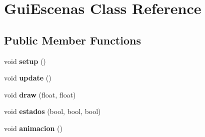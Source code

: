 \hypertarget{class_gui_escenas}{}\section{Gui\+Escenas Class Reference}
\label{class_gui_escenas}
\subsection*{Public Member Functions}
\begin{DoxyCompactItemize}
\item 
\hypertarget{class_gui_escenas_afd7a3d6c2ff49ce9f17e1089fd1ccc2b}{}void {\bfseries setup} ()\label{class_gui_escenas_afd7a3d6c2ff49ce9f17e1089fd1ccc2b}

\item 
\hypertarget{class_gui_escenas_a837ee8acb5f449eb82ca1cdd319733f7}{}void {\bfseries update} ()\label{class_gui_escenas_a837ee8acb5f449eb82ca1cdd319733f7}

\item 
\hypertarget{class_gui_escenas_a70bdf37ee6516e2ef675de567d52dc02}{}void {\bfseries draw} (float, float)\label{class_gui_escenas_a70bdf37ee6516e2ef675de567d52dc02}

\item 
\hypertarget{class_gui_escenas_aadd74fc574d8dfe8a72194e2262e22cd}{}void {\bfseries estados} (bool, bool, bool)\label{class_gui_escenas_aadd74fc574d8dfe8a72194e2262e22cd}

\item 
\hypertarget{class_gui_escenas_a85ba8565139f013e797eb3fcf38a637e}{}void {\bfseries animacion} ()\label{class_gui_escenas_a85ba8565139f013e797eb3fcf38a637e}

\end{DoxyCompactItemize}
